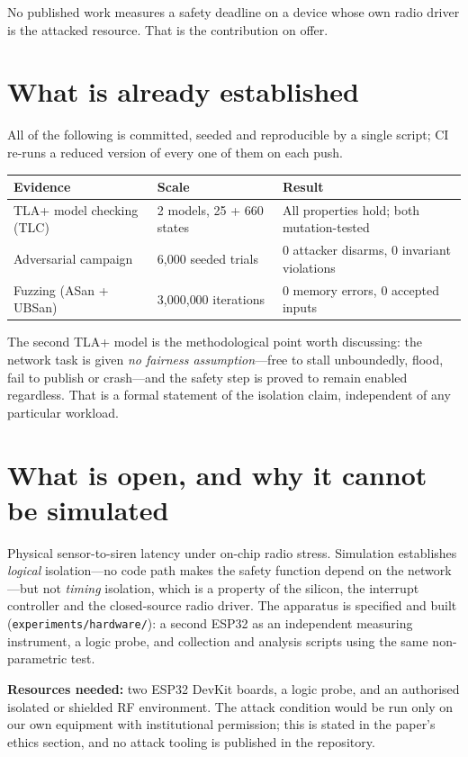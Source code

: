 \documentclass[10pt]{article}
\begin{document}
No published work measures a safety deadline on a device whose own radio driver is the attacked
resource. That is the contribution on offer.

\section{What is already established}
All of the following is committed, seeded and reproducible by a single script; CI re-runs a reduced
version of every one of them on each push.

\begin{tabular}{@{}lll@{}}
\toprule
Evidence & Scale & Result \\
\midrule
TLA+ model checking (TLC) & 2 models, 25 + 660 states & All properties hold; both mutation-tested \\
Adversarial campaign & 6{,}000 seeded trials & 0 attacker disarms, 0 invariant violations \\
Fuzzing (ASan + UBSan) & 3{,}000{,}000 iterations & 0 memory errors, 0 accepted inputs \\
\bottomrule
\end{tabular}

The second TLA+ model is the methodological point worth discussing: the network task is given
\emph{no fairness assumption}---free to stall unboundedly, flood, fail to publish or crash---and
the safety step is proved to remain enabled regardless. That is a formal statement of the isolation
claim, independent of any particular workload.

\section{What is open, and why it cannot be simulated}
Physical sensor-to-siren latency under on-chip radio stress. Simulation establishes \emph{logical}
isolation---no code path makes the safety function depend on the network---but not \emph{timing}
isolation, which is a property of the silicon, the interrupt controller and the closed-source radio
driver. The apparatus is specified and built (\texttt{experiments/hardware/}): a second ESP32 as an
independent measuring instrument, a logic probe, and collection and analysis scripts using the same
non-parametric test.

\textbf{Resources needed:} two ESP32 DevKit boards, a logic probe, and an authorised isolated or
shielded RF environment. The attack condition would be run only on our own equipment with
institutional permission; this is stated in the paper's ethics section, and no attack tooling is
published in the repository.
\end{document}
